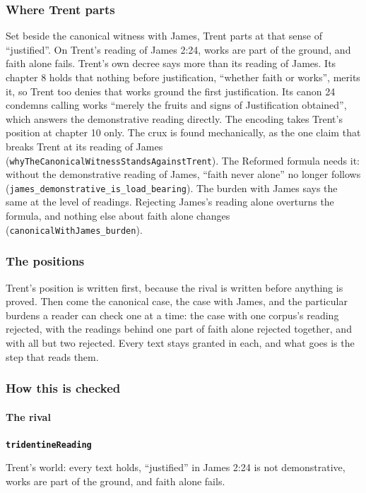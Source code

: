 \documentclass[11pt,paper=\testimonypaper,DIV=13,parskip=false]{scrartcl}
\begin{document}
\subsubsection*{Where Trent parts}
Set beside the canonical witness with James, Trent parts at that sense of “justified”. On Trent’s reading of James 2:24, works are part of the ground, and faith alone fails. Trent’s own decree says more than its reading of James. Its chapter 8 holds that nothing before justification, “whether faith or works”, merits it, so Trent too denies that works ground the first justification. Its canon 24 condemns calling works “merely the fruits and signs of Justification obtained”, which answers the demonstrative reading directly. The encoding takes Trent’s position at chapter 10 only. The crux is found mechanically, as the one claim that breaks Trent at its reading of James (\texttt{why\allowbreak{}The\allowbreak{}Canonical\allowbreak{}Witness\allowbreak{}Stands\allowbreak{}Against\allowbreak{}Trent}). The Reformed formula needs it: without the demonstrative reading of James, “faith never alone” no longer follows (\texttt{james\_\allowbreak{}demonstrative\_\allowbreak{}is\_\allowbreak{}load\_\allowbreak{}bearing}). The burden with James says the same at the level of readings. Rejecting James’s reading alone overturns the formula, and nothing else about faith alone changes (\texttt{canonical\allowbreak{}With\allowbreak{}James\_\allowbreak{}burden}).

\subsubsection*{The positions}
Trent’s position is written first, because the rival is written before anything is proved. Then come the canonical case, the case with James, and the particular burdens a reader can check one at a time: the case with one corpus’s reading rejected, with the readings behind one part of faith alone rejected together, and with all but two rejected. Every text stays granted in each, and what goes is the step that reads them.

\subsubsection*{How this is checked}
\paragraph*{The rival}
\leavevmode\par\nobreak
\par\medskip\noindent\textbf{\texttt{tridentine\allowbreak{}Reading}}\par\nobreak\noindent
Trent’s world: every text holds, “justified” in James 2:24 is not demonstrative, works are part of the ground, and faith alone fails.
\end{document}
